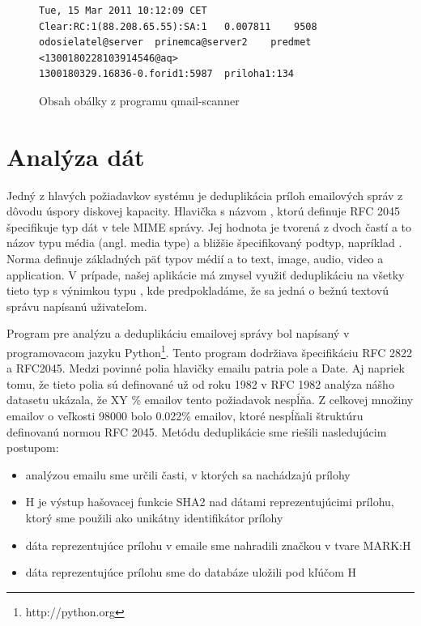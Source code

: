 \documentclass[11pt,twoside,a4paper]{book}
\begin{document}
\begin{figure}[h]
\begin{verbatim}
Tue, 15 Mar 2011 10:12:09 CET	Clear:RC:1(88.208.65.55):SA:1	0.007811	9508	odosielatel@server	prinemca@server2	predmet	<1300180228103914546@aq>	
1300180329.16836-0.forid1:5987	priloha1:134
\end{verbatim}
 \caption{Obsah obálky z programu qmail-scanner}
 \label{fig:envelope}
\end{figure}


\section{Analýza dát}
Jedný z hlavých požiadavkov systému je deduplikácia príloh emailových správ z dôvodu úspory diskovej kapacity. Hlavička s názvom , ktorú definuje RFC 2045 špecifikuje typ dát v tele MIME správy. Jej hodnota je tvorená z dvoch častí a to názov typu média (angl. media type) a bližšie špecifikovaný podtyp, napríklad . Norma definuje základných päť typov médií a to text, image, audio, video a application. V prípade, našej aplikácie má zmysel využiť deduplikáciu na všetky tieto typ s výnimkou typu , kde predpokladáme, že sa jedná o bežnú textovú správu napísanú uživateľom.

Program pre analýzu a deduplikáciu emailovej správy bol napísaný v programovacom jazyku Python\footnote{http://python.org}. Tento program dodržiava špecifikáciu RFC 2822 a RFC2045. 
Medzi povinné polia hlavičky emailu patria pole  a {Date}. Aj napriek tomu, že tieto polia sú definované už od roku 1982 v RFC 1982 analýza nášho datasetu ukázala, že XY \% emailov tento požiadavok nespĺňa. Z celkovej množiny emailov o veľkosti 98000 bolo 0.022\% emailov, ktoré nespĺňali štruktúru definovanú normou RFC 2045. Metódu deduplikácie sme riešili nasledujúcim postupom:

\begin{itemize}
 \item analýzou emailu sme určili časti, v ktorých sa nachádzajú prílohy
 \item H je výstup hašovacej funkcie SHA2 nad dátami reprezentujúcimi prílohu, ktorý sme použili ako unikátny identifikátor prílohy
 \item dáta reprezentujúce prílohu v emaile sme nahradili značkou v tvare MARK:H
 \item dáta reprezentujúce prílohu sme do databáze uložili pod kľúčom H
\end{itemize}
\end{document}
